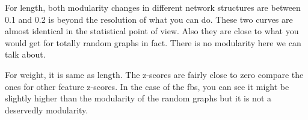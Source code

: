 For length, both modularity changes in different network structures are between 0.1 and 0.2 is beyond the resolution of what you can do. These two curves are almost identical in the statistical point of view. Also they are close to what you would get for totally random graphs in fact. There is no modularity here we can talk about.

For weight, it is same as length. The z-scores are fairly close to zero compare the ones for other feature z-scores. In the case of the fbs, you can see it might be slightly higher than the modularity of the random graphs but it is not a deservedly modularity.


